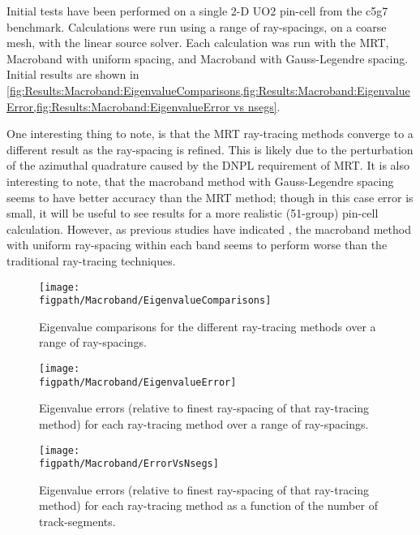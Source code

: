 {{        Initial tests have been performed on a single 2-D \acs{UO2} pin-cell from the c5g7 benchmark.
        Calculations were run using a range of ray-spacings, on a coarse mesh, with the linear source solver.
        Each calculation was run with the \ac{MRT}, Macroband with uniform spacing, and Macroband with Gauss-Legendre spacing.
        Initial results are shown in \cref{fig:Results:Macroband:EigenvalueComparisons,fig:Results:Macroband:EigenvalueError,fig:Results:Macroband:EigenvalueError vs nsegs}.

        One interesting thing to note, is that the \ac{MRT} ray-tracing methods converge to a different result as the ray-spacing is refined.
        This is likely due to the perturbation of the azimuthal quadrature caused by the \ac{DNPL} requirement of \ac{MRT}.
        It is also interesting to note, that the macroband method with Gauss-Legendre spacing seems to have better accuracy than the \ac{MRT} method; though in this case error is small, it will be useful to see results for a more realistic (51-group) pin-cell calculation.
        However, as previous studies have indicated \cite{Yamamoto2005}, the macroband method with uniform ray-spacing within each band seems to perform worse than the traditional ray-tracing techniques.

        \begin{figure}[h]
            \centering
            \texttt{[image: \\figpath/Macroband/EigenvalueComparisons]}
            \caption{Eigenvalue comparisons for the different ray-tracing methods over a range of ray-spacings.}
            \label{fig:Results:Macroband:EigenvalueComparisons}
        \end{figure}
        \begin{figure}[h]
            \centering
            \texttt{[image: \\figpath/Macroband/EigenvalueError]}
            \caption{Eigenvalue errors (relative to finest ray-spacing of that ray-tracing method) for each ray-tracing method over a range of ray-spacings.}
            \label{fig:Results:Macroband:EigenvalueError}
        \end{figure}
        \begin{figure}[h]
            \centering
            \texttt{[image: \\figpath/Macroband/ErrorVsNsegs]}
            \caption{Eigenvalue errors (relative to finest ray-spacing of that ray-tracing method) for each ray-tracing method as a function of the number of track-segments.}
            \label{fig:Results:Macroband:EigenvalueError vs nsegs}
        \end{figure}

}}
